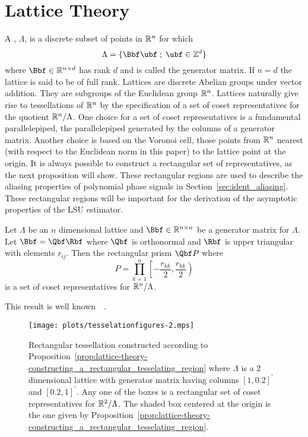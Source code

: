 \documentclass[journal]{IEEEtran}
\begin{document}
\section{Lattice Theory}\label{sec:lattice-theory}

A ,  $\Lambda$, is a discrete subset of points in ${\mathbb R}^n$ for which
\[
   \Lambda = \{\Bbf\ubf \mid \ubf \in \ints^d \}
\]
where $\Bbf \in \reals^{n \times d}$ has rank $d$ and is called the generator matrix.  If $n = d$ the lattice is said to be of full rank.  Lattices are discrete Abelian groups under vector addition.  They are subgroups of the Euclidean group ${\mathbb R}^n$.  Lattices naturally give rise to tessellations of ${\mathbb R}^n$ by the specification of a set of coset representatives for the quotient ${\mathbb R}^n / \Lambda$.  One choice for a set of coset representatives is a fundamental parallelepiped, the parallelepiped generated by the columns of a generator matrix.  Another choice is based on the Voronoi cell, those points from ${\mathbb R}^n$ nearest (with respect to the Euclidean norm in this paper) to the lattice point at the origin.  It is always possible to construct a rectangular set of representatives, as the next proposition will show.  These rectangular regions are used to describe the aliasing properties of polynomial phase signals in Section~\ref{sec:ident_aliasing}.  These rectangular regions will be important for the derivation of the asymptotic properties of the LSU estimator.

\begin{proposition}\label{prop:lattice-theory-constructing_a_rectangular_tesselating_region}
Let  $\Lambda$ be an $n$ dimensional lattice and $\Bbf \in \reals^{n\times n}$ be a generator matrix for $\Lambda$. Let $\Bbf = \Qbf\Rbf$ where $\Qbf$ is orthonormal and $\Rbf$ is upper triangular with elements $r_{ij}$.  Then the rectangular prism $\Qbf P$ where
\[
P = \prod_{k=1}^{n}{\left[-\frac{r_{kk}}{2}, \frac{r_{kk}}{2}\right)}
\]
is a set of coset representatives for ${\mathbb R}^n / \Lambda$.
\end{proposition}
\begin{IEEEproof}
This result is well known~\cite[Chapter IX, Theorem IV]{Cassels_geom_numbers_1997}~\cite[Proposition 2.1]{McKilliam2010thesis}.  %
\end{IEEEproof}

\begin{figure}[tp]
	\centering
		\texttt{[image: plots/tesselationfigures-2.mps]}
		\caption{Rectangular tessellation constructed according to Proposition~\ref{prop:lattice-theory-constructing_a_rectangular_tesselating_region} where $\Lambda$ is a 2 dimensional lattice with generator matrix having columns $[1, 0.2]^\prime$ and $[0.2, 1]^\prime$. Any one of the boxes is a rectangular set of coset representatives for ${\mathbb R}^2 / \Lambda$.  The shaded box centered at the origin is the one given by Proposition~\ref{prop:lattice-theory-constructing_a_rectangular_tesselating_region}.}
		\label{lattices:fig:tessellation2}
\end{figure} 
\end{document}
